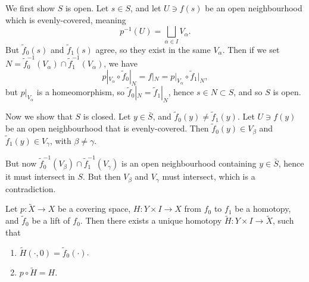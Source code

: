 \documentclass[12pt]{article}
\begin{document}
\begin{proofbox}
	We first show $S$ is open. Let $s \in S$, and let $U \ni f(s)$ be an open neighbourhood which is evenly-covered, meaning
	\[
	p^{-1}(U) = \bigsqcup_{\alpha \in I} V_\alpha.
	\]
	But $\tilde f_0(s)$ and $\tilde f_1(s)$ agree, so they exist in the same $V_\alpha$. Then if we set $N = \tilde f_0^{-1}(V_\alpha) \cap \tilde f_1^{-1}(V_\alpha)$, we have
	\[
	p|_{V_\alpha} \circ \tilde f_0|_N = f|_N = p|_{V_\alpha} \circ \tilde f_1|_N,
	\]
	but $p|_{V_\alpha}$ is a homeomorphism, so $\tilde f_0|_N = \tilde f_1|_N$, hence $s \in N \subset S$, and so $S$ is open.

	Now we show that $S$ is closed. Let $y \in \bar S$, and $\tilde f_0(y) \neq \tilde f_1(y)$. Let $U \ni f(y)$ be an open neighbourhood that is evenly-covered. Then $\tilde f_0(y) \in V_\beta$ and $\tilde f_1(y) \in V_\gamma$, with $\beta \neq \gamma$.

	But now $\tilde f_0^{-1}(V_\beta) \cap \tilde f_1^{-1}(V_\gamma)$ is an open neighbourhood containing $y \in \bar S$, hence it must intersect in $S$. But then $V_\beta$ and $V_\gamma$ must intersect, which is a contradiction.
\end{proofbox}

\begin{theorem}
	Let $p : \tilde X \to X$ be a covering space, $H : Y \times I \to X$ from $f_0$ to $f_1$ be a homotopy, and $\tilde f_0$ be a lift of $f_0$. Then there exists a unique homotopy $\tilde H : Y \times I \to \tilde X$, such that
	\begin{enumerate}[\normalfont(i)]
		\item $\tilde H(\cdot, 0) = \tilde f_0(\cdot)$.
		\item $p \circ \tilde H = H$.
	\end{enumerate}
\end{theorem}
\end{document}
